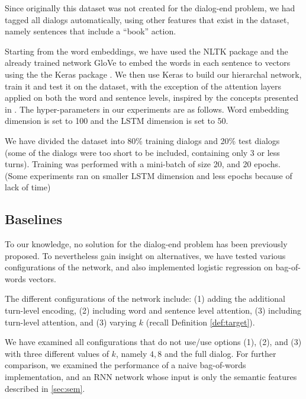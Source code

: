 Since originally this dataset was not created for the dialog-end problem, 
we had tagged all dialogs automatically, using other features that exist 
in the dataset, namely sentences that include a ``book'' action. 

Starting from the word embeddings, we have used the 
NLTK package \cite{DBLP:conf/acl/Bird06} and the already trained network GloVe \cite{glove} 
to embed the words in each sentence to vectors using the the Keras package \cite{chollet2015}. 
We then use Keras to build our hierarchal network, train it and test it on the 
dataset, with the exception of the attention layers applied on both the word and sentence 
levels, inspired by the concepts presented in \cite{attention}. 
The hyper-parameters in our experiments are as follows. 
Word embedding dimension is set to 100 and the 
LSTM dimension is set to 50. 

We have divided the dataset into 80\% training dialogs and 20\% test dialogs 
(some of the dialogs were too short to be included, containing only 3 or less turns).
Training was performed with a mini-batch of size 20, 
and 20 epochs. (Some experiments ran on smaller LSTM dimension and less epochs because of 
lack of time)

\subsection{Baselines}%
To our knowledge, no solution for the 
dialog-end problem has been previously proposed. To nevertheless
gain insight on alternatives, we have tested various configurations 
of the network, and also implemented logistic regression on bag-of-words vectors.

The different configurations of the network include: 
(1) adding the additional turn-level encoding, 
(2) including word and sentence level attention, 
(3) including turn-level attention, and 
(3) varying $k$ (recall Definition \ref{def:target}).

We have examined all configurations that do not use/use options 
(1), (2), and (3) with three different values of $k$, namely $4,8$ and 
the full dialog. 
For further comparison, we examined the performance of a naive bag-of-words 
implementation, and an RNN network whose input is only the semantic features described in \ref{sec:sem}. 


